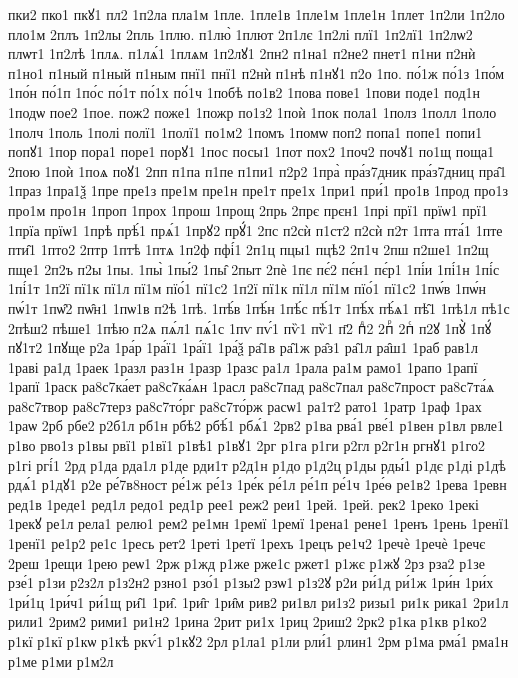 {пки2
пко1
пкꙋ1
пл2
1п2ла
пла1м
1пле.
1пле1в
1пле1м
1пле1н
1плет
1п2ли
1п2ло
пло1м
2плъ
1п2лы
2пль
1плю.
п1лю̀
1плют
2п1лє
1п2лі
плї1
1п2лї1
1п2лѡ2
плѡт1
1п2лѣ
1плѧ.
п1лѧ́1
1плѧм
1п2лꙋ1
2пн2
п1на1
п2не2
пнет1
п1ни
п2нѝ
п1но1
п1ный
п1ный
п1ным
пнї1
пнї1
п2нѝ
п1нѣ
п1нꙋ1
п2о
1по.
по́1ж
по́1з
1по́м
1по́н
по́1п
1по́с
по́1т
по́1х
по́1ч
1побѣ
по1в2
1пова
пове1
1пови
поде1
под1н
1подѡ
пое2
1пое.
пож2
поже1
1пожр
по1з2
1поѝ
1пок
пола1
1полз
1полл
1поло
1полч
1поль
1полі
полї1
1полї1
по1м2
1помъ
1помѡ
поп2
попа1
попе1
попи1
попꙋ1
1пор
пора1
поре1
порꙋ1
1пос
посы1
1пот
пох2
1поч2
почꙋ1
по1щ
поща1
2пою
1поѝ
1поѧ
поꙋ1
2пп
п1па
п1пе
п1пи1
п2р2
1пра̀
пра́з7дник
пра́з7дниц
пра̑1
1праз
1пра1ѯ
1пре
пре1з
пре1м
пре1н
пре1т
пре1х
1при1
при́1
про1в
1прод
про1з
про1м
про1н
1проп
1прох
1прош
1прощ
2прь
2прє
прєн1
1прі
прї1
прїѡ1
прї1
1прїа
прїѡ1
1прѣ
прѣ́1
прѧ́1
1прꙋ2
прꙋ́1
2пс
п2сѝ
п1ст2
п2сѝ
п2т
1пта
пта́1
1пте
пти̑1
1пто2
2птр
1птѣ
1птѧ
1п2ф
пфі́1
2п1ц
пцы1
пцѣ2
2п1ч
2пш
п2ше1
1п2щ
пще1
2п2ъ
п2ы
1пы.
1пы̀
1пы́2
1пы̑
2пыт
2пѐ
1пє
пє́2
пє́н1
пє́р1
1пі́и
1пі́1н
1пі́с
1пі́1т
1п2ї
пї1к
пї1л
пї1м
пїо́1
пї1с2
1п2ї
пї1к
пї1л
пї1м
пїо́1
пї1с2
1пѡ́в
1пѡ́н
пѡ́1т
1пѡ̑2
пѡ̑н1
1пѡ1в
п2ѣ
1пѣ.
1пѣ́в
1пѣ́н
1пѣ́с
пѣ́1т
1пѣ́х
пѣ́ѧ1
пѣ̑1
1пѣ1л
пѣ1с
2пѣш2
пѣше1
1пѣю
п2ѧ
пѧ́л1
пѧ́1с
1пѵ
пѵ́1
пѷ1
пѷ1
п҃2
пⷣ2
2пⷬ
2пⷭ
п2ꙋ
1пꙋ̀
1пꙋ́
пꙋ1т2
1пꙋще
р2а
1ра́р
1ра́ї1
1ра́ї1
1ра́ѯ
ра̑1в
ра̑1ж
ра̑з1
ра̑1л
ра̑ш1
1раб
рав1л
1раві
ра1д
1раек
1разл
раз1н
1разр
1разс
ра1л
1рала
ра1м
рамо1
1рапо
1рапї
1рапї
1раск
ра8с7ка́ет
ра8с7ка́ѧн
1расл
ра8с7пад
ра8с7пал
ра8с7прост
ра8с7та́ѧ
ра8с7твор
ра8с7терз
ра8с7то́рг
ра8с7то́рж
расѡ1
ра1т2
рато1
1ратр
1раф
1рах
1раѡ
2рб
рбе2
р2б1л
рб1н
рбѣ2
рбѣ́1
рбѧ́1
2рв2
р1ва
рва́1
рве́1
р1вен
р1вл
рвле1
р1во
рво1з
р1вы
рвї1
р1вї1
р1вѣ1
р1вꙋ1
2рг
р1га
р1ги
р2гл
р2г1н
ргнꙋ1
р1го2
р1гі
ргі́1
2рд
р1да
рда1л
р1де
рди1т
р2д1н
р1до
р1д2ц
р1ды
рды́1
р1дє
р1ді
р1дѣ
рдѧ́1
р1дꙋ1
р2е
ре́7в8ност
ре́1ж
ре́1з
1ре́к
ре́1л
ре́1п
ре́1ч
1ре́ѳ
ре1в2
1рева
1ревн
ред1в
1реде1
ред1л
редо1
ред1р
рее1
реж2
реи1
1рей.
1рей.
рек2
1реко
1рекі
1рекꙋ
ре1л
рела1
релю1
рем2
ре1мн
1ремї
1ремї
1рена1
рене1
1ренъ
1рень
1ренї1
1ренї1
ре1р2
ре1с
1ресь
рет2
1реті
1ретї
1рехъ
1рецъ
ре1ч2
1речѐ
1речѐ
1речє
2реш
1рещи
1рею
реѡ1
2рж
р1жд
р1же
рже1с
ржет1
р1жє
р1жꙋ
2рз
рза2
р1зе
рзе́1
р1зи
р2з2л
р1з2н2
рзно1
рзо́1
р1зы2
рзѡ1
р1з2ꙋ
р2и
ри́1д
ри́1ж
1ри́н
1ри́х
1ри́1ц
1ри́ч1
ри́1щ
ри̑1
1ри̑.
1ри̑г
1ри̑м
рив2
ри1вл
ри1з2
ризы1
ри1к
рика1
2ри1л
рили1
2рим2
рими1
ри1н2
1рина
2рит
ри1х
1риц
2риш2
2рк2
р1ка
р1кв
р1ко2
р1кї
р1кї
р1кѡ
р1кѣ
ркѵ́1
р1кꙋ2
2рл
р1ла1
р1ли
рли́1
рлин1
2рм
р1ма
рма́1
рма1н
р1ме
р1ми
р1м2л
}
